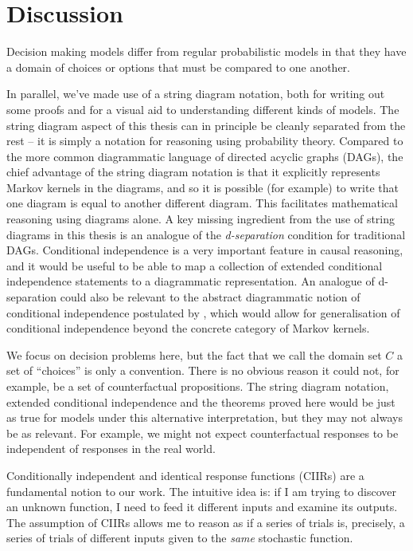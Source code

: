 

\chapter{Discussion}\label{ch:discussion}

Decision making models differ from regular probabilistic models in that they have a domain of choices or options that must be compared to one another. 

In parallel, we've made use of a string diagram notation, both for writing out some proofs and for a visual aid to understanding different kinds of models. The string diagram aspect of this thesis can in principle be cleanly separated from the rest -- it is simply a notation for reasoning using probability theory. Compared to the more common diagrammatic language of directed acyclic graphs (DAGs), the chief advantage of the string diagram notation is that it explicitly represents Markov kernels in the diagrams, and so it is possible (for example) to write that one diagram is equal to another different diagram. This facilitates mathematical reasoning using diagrams alone. A key missing ingredient from the use of string diagrams in this thesis is an analogue of the \emph{d-separation} condition for traditional DAGs. Conditional independence is a very important feature in causal reasoning, and it would be useful to be able to map a collection of extended conditional independence statements to a diagrammatic representation. An analogue of d-separation could also be relevant to the abstract diagrammatic notion of conditional independence postulated by \citet{fritz_synthetic_2020}, which would allow for generalisation of conditional independence beyond the concrete category of Markov kernels.

We focus on decision problems here, but the fact that we call the domain set $C$ a set of ``choices'' is only a convention. There is no obvious reason it could not, for example, be a set of counterfactual propositions. The string diagram notation, extended conditional independence and the theorems proved here would be just as true for models under this alternative interpretation, but they may not always be as relevant. For example, we might not expect counterfactual responses to be independent of responses in the real world.

Conditionally independent and identical response functions (CIIRs) are a fundamental notion to our work. The intuitive idea is: if I am trying to discover an unknown function, I need to feed it different inputs and examine its outputs. The assumption of CIIRs allows me to reason as if a series of trials is, precisely, a series of trials of different inputs given to the \emph{same} stochastic function.

